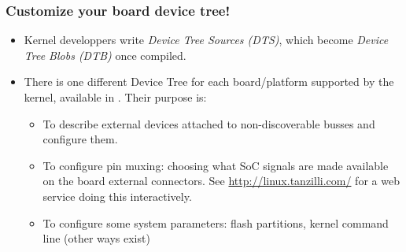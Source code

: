 \begin{frame}
  \frametitle{Customize your board device tree!}
  \begin{itemize}
  \item Kernel developpers write {\em Device Tree Sources (DTS)},
    which become {\em Device Tree Blobs (DTB)} once compiled.
  \item There is one different Device Tree for each board/platform
    supported by the kernel, available in
    . Their purpose is:
    \begin{itemize}
    \item To describe external devices attached to non-discoverable
      busses and configure them.
    \item To configure pin muxing: choosing what SoC signals are
      made available on the board external connectors.
      See \url{http://linux.tanzilli.com/} for a web service doing this
      interactively.
    \item To configure some system parameters: flash partitions,
      kernel command line (other ways exist)
    \end{itemize}
  \end{itemize}
\end{frame}
